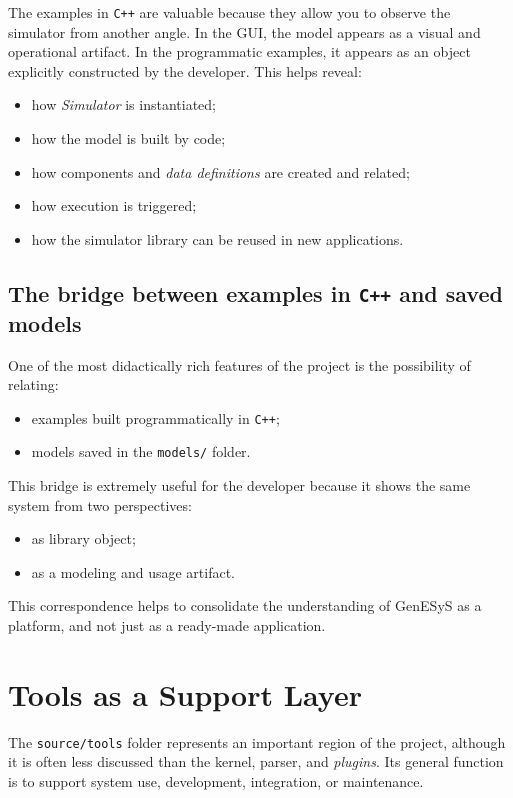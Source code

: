 The examples in \texttt{C++} are valuable because they allow you to observe the simulator from another angle. In the GUI, the model appears as a visual and operational artifact. In the programmatic examples, it appears as an object explicitly constructed by the developer. This helps reveal:
\begin{itemize}
 \item how \textit{Simulator} is instantiated;
 \item how the model is built by code;
 \item how components and \textit{data definitions} are created and related;
 \item how execution is triggered;
 \item how the simulator library can be reused in new applications.
\end{itemize}

\subsection{The bridge between examples in \texttt{C++} and saved models}
\label{subsec:cap10_ponte_exemplos_cpp_modelos_salvos}

One of the most didactically rich features of the project is the possibility of relating:
\begin{itemize}
 \item examples built programmatically in \texttt{C++};
 \item models saved in the \texttt{models/} folder.
\end{itemize}

This bridge is extremely useful for the developer because it shows the same system from two perspectives:
\begin{itemize}
 \item as library object;
 \item as a modeling and usage artifact.
\end{itemize}

This correspondence helps to consolidate the understanding of GenESyS as a platform, and not just as a ready-made application.

\section{Tools as a Support Layer}
\label{sec:cap10_tools_como_camada_apoio}

The \texttt{source/tools} folder represents an important region of the project, although it is often less discussed than the kernel, parser, and \textit{plugins}. Its general function is to support system use, development, integration, or maintenance.

